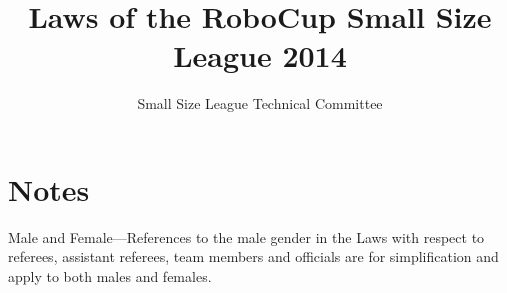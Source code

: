 \documentclass[12pt]{article}
\newif\ifdiff
\newcommand{\added}[1]{\textcolor{green}{#1}}
\newcommand{\removed}[1]{\textcolor{red}{#1}}
\newcommand{\added}[1]{#1}
\newcommand{\removed}[1]{}
\begin{document}
\setcounter{page}{1}

\title{Laws of the RoboCup Small Size League 2014}
\author{Small Size League Technical Committee}

\maketitle

\vfill

\tableofcontents

\section*{Notes}
Male and Female---References to the male gender in the Laws with respect to referees, assistant referees, team members and officials are for simplification and apply to both males and females.

\ifdiff
\added{Text added from the previous year is shown in green.}
\removed{Text removed from the previous year is shown in red.}
\fi

\thispagestyle{fancy}

\clearpage

\cfoot{\thepage}
\setcounter{page}{1}



















\appendix



\end{document}
